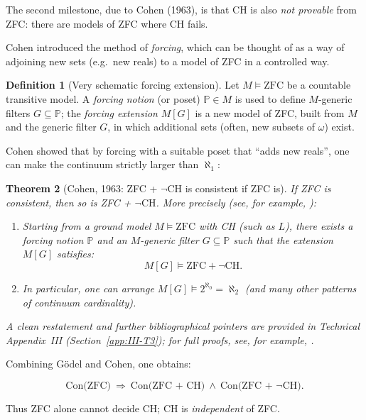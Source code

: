\documentclass[11pt]{book}
\theoremstyle{plain}
\newtheorem{theorem}{Theorem}[chapter]      \newtheorem{proposition}[theorem]{Proposition} \newtheorem{lemma}[theorem]{Lemma}          \newtheorem{corollary}[theorem]{Corollary}
\theoremstyle{definition}
\newtheorem{definition}[theorem]{Definition} \theoremstyle{remark}
\begin{document}
The second milestone, due to Cohen (1963), is that CH is also \emph{not
provable} from ZFC: there are models of ZFC where CH fails.

Cohen introduced the method of \emph{forcing}, which can be thought of
as a way of adjoining new sets (e.g.\ new reals) to a model of ZFC in a
controlled way.

\begin{definition}[Very schematic forcing extension]
  Let $M\models\text{ZFC}$ be a countable transitive model. A
  \emph{forcing notion} (or poset) $\mathbb{P}\in M$ is used to define
  $M$-generic filters $G\subseteq\mathbb{P}$; the \emph{forcing
  extension} $M[G]$ is a new model of ZFC, built from $M$ and the
  generic filter $G$, in which additional sets (often, new subsets of
  $\omega$) exist.
\end{definition}

Cohen showed that by forcing with a suitable poset that “adds new
reals”, one can make the continuum strictly larger than $\aleph_1$:

\begin{theorem}[Cohen, 1963: ZFC + $\neg\text{CH}$ is consistent if ZFC is]
  If ZFC is consistent, then so is ZFC + $\neg\text{CH}$. More precisely (see, for example, \cite{Cohen1963,Jech2003}):
  \begin{enumerate}[label=\roman*)]
    \item Starting from a ground model $M\models\text{ZFC}$ with CH
          (such as $L$), there exists a forcing notion $\mathbb{P}$ and
          an $M$-generic filter $G\subseteq\mathbb{P}$ such that the
          extension $M[G]$ satisfies:
          \[
             M[G]\models\text{ZFC} + \neg\text{CH}.
          \]
    \item In particular, one can arrange
          $M[G]\models 2^{\aleph_0} = \aleph_2$
          (and many other patterns of continuum cardinality).
  \end{enumerate}
  A clean restatement and further bibliographical pointers are provided
  in Technical Appendix~III (Section~\ref{app:III-T3}); for full proofs,
  see, for example, \cite{Cohen1963,Jech2003}.
\end{theorem}

Combining Gödel and Cohen, one obtains:

\[
  \text{Con(ZFC)}
  \ \Longrightarrow\
  \text{Con(ZFC + CH)}\ \wedge\ \text{Con(ZFC + $\neg$CH)}.
\]

Thus ZFC alone cannot decide CH; CH is \emph{independent} of ZFC.
\end{document}
